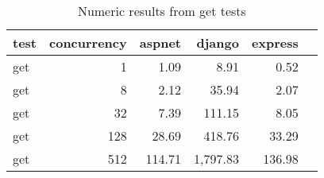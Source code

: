 \FloatBarrier
\begin{table}[!htp]\centering
    \caption{Numeric results from get tests}\label{tab:resultsGet}
    \scriptsize
    \begin{tabular}{lrrrrr}\toprule
        test & concurrency & aspnet & django   & express \\\midrule
        get  & 1           & 1.09   & 8.91     & 0.52    \\
        get  & 8           & 2.12   & 35.94    & 2.07    \\
        get  & 32          & 7.39   & 111.15   & 8.05    \\
        get  & 128         & 28.69  & 418.76   & 33.29   \\
        get  & 512         & 114.71 & 1,797.83 & 136.98  \\
        \bottomrule
    \end{tabular}
\end{table}
\FloatBarrier

